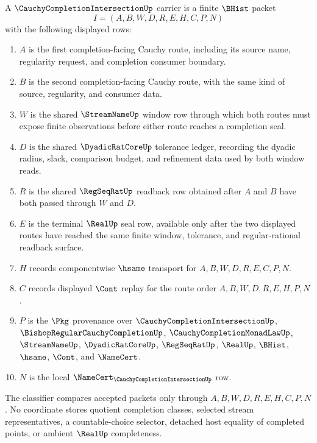 \begin{definition}
\label{def:cauchy-completion-intersection-carrier}
A $\CauchyCompletionIntersectionUp$ carrier is a finite $\BHist$ packet
$$
I=(A,B,W,D,R,E,H,C,P,N)
$$
with the following displayed rows:
\begin{enumerate}
\item $A$ is the first completion-facing Cauchy route, including its source name, regularity request, and completion consumer boundary.
\item $B$ is the second completion-facing Cauchy route, with the same kind of source, regularity, and consumer data.
\item $W$ is the shared $\StreamNameUp$ window row through which both routes must expose finite observations before either route reaches a completion seal.
\item $D$ is the shared $\DyadicRatCoreUp$ tolerance ledger, recording the dyadic radius, slack, comparison budget, and refinement data used by both window reads.
\item $R$ is the shared $\RegSeqRatUp$ readback row obtained after $A$ and $B$ have both passed through $W$ and $D$.
\item $E$ is the terminal $\RealUp$ seal row, available only after the two displayed routes have reached the same finite window, tolerance, and regular-rational readback surface.
\item $H$ records componentwise $\hsame$ transport for $A,B,W,D,R,E,C,P,N$.
\item $C$ records displayed $\Cont$ replay for the route order $A,B,W,D,R,E,H,P,N$.
\item $P$ is the $\Pkg$ provenance over $\CauchyCompletionIntersectionUp$, $\BishopRegularCauchyCompletionUp$, $\CauchyCompletionMonadLawUp$, $\StreamNameUp$, $\DyadicRatCoreUp$, $\RegSeqRatUp$, $\RealUp$, $\BHist$, $\hsame$, $\Cont$, and $\NameCert$.
\item $N$ is the local $\NameCert_{\CauchyCompletionIntersectionUp}$ row.
\end{enumerate}
The classifier compares accepted packets only through $A,B,W,D,R,E,H,C,P,N$. No coordinate stores quotient completion classes, selected stream representatives, a countable-choice selector, detached host equality of completed points, or ambient $\RealUp$ completeness.
\end{definition}

